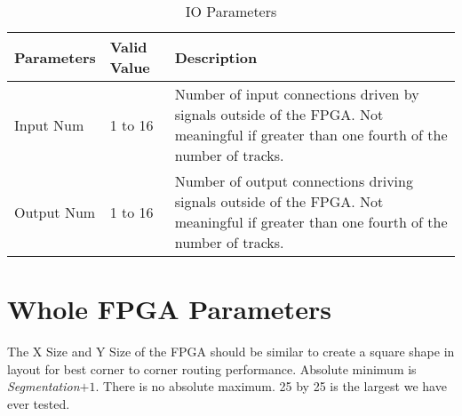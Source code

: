 \begin{table}[htpb]
		\begin{center}
				{\footnotesize
				{\tabulinesep=1.2mm
				\begin{tabu}{ | p{0.9in} | p{1.2in} | p{2.8in} |}    \hline
				Parameters & Valid Value & Description \\ \hline\hline
				
				Input Num & 1 to 16 & Number of input connections driven by signals outside of the FPGA. Not meaningful if greater than one fourth of the number of tracks. \\ \hline
				Output Num & 1 to 16 & Number of output connections driving signals outside of the FPGA. Not meaningful if greater than one fourth of the number of tracks. \\ \hline
				
				\end{tabu}}}
				\caption{IO Parameters
				\label{table:io_params}}
		\end{center}
\end{table}

\section{Whole FPGA Parameters}
\label{sec:fpga_param}

The X Size and Y Size of the FPGA should be similar to create a square shape in layout for best corner to corner routing performance. Absolute minimum is \emph{Segmentation}$+1$.
There is no absolute maximum. 25 by 25 is the largest we have ever tested. \par
